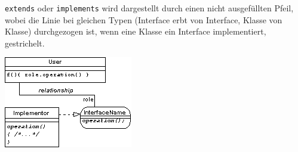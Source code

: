 \documentclass[12pt,a4]{article}
\begin{document}
 	\texttt{extends} oder \texttt{implements} wird dargestellt durch einen nicht ausgefüllten Pfeil, wobei die Linie bei gleichen Typen (Interface erbt von Interface, Klasse von Klasse) durchgezogen ist, wenn eine Klasse ein Interface implementiert, gestrichelt.
 	
 	\begin{center}
 		\includegraphics[width=0.5\linewidth]{images/interface1}
 	\end{center}

		
	 
\end{document}
